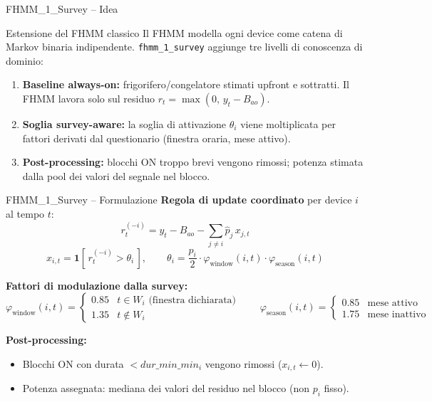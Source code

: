 \documentclass[aspectratio=169]{beamer}
\newcommand{\code}[1]{\texttt{\small #1}}
\begin{document}
\begin{frame}{FHMM\_1\_Survey -- Idea}
  \small
  \begin{block}{Estensione del FHMM classico}
    Il FHMM modella ogni device come catena di Markov binaria indipendente.
    \code{fhmm\_1\_survey} aggiunge tre livelli di conoscenza di dominio:
  \end{block}

  \vspace{0.4em}
  \begin{enumerate}
    \item \textbf{Baseline always-on:} frigorifero/congelatore stimati upfront e sottratti.
          Il FHMM lavora solo sul residuo $r_t = \max(0,\, y_t - B_{ao})$.
    \item \textbf{Soglia survey-aware:} la soglia di attivazione $\theta_i$ viene moltiplicata
          per fattori derivati dal questionario (finestra oraria, mese attivo).
    \item \textbf{Post-processing:} blocchi ON troppo brevi vengono rimossi;
          potenza stimata dalla pool dei valori del segnale nel blocco.
  \end{enumerate}
\end{frame}

\begin{frame}{FHMM\_1\_Survey -- Formulazione}
  \small
  \textbf{Regola di update coordinato} per device $i$ al tempo $t$:
  \[
    r^{(-i)}_t = y_t - B_{ao} - \sum_{j \neq i} \hat{p}_j\, x_{j,t}
  \]
  \[
    x_{i,t} = \mathbf{1}\!\left[\, r^{(-i)}_t > \theta_i \,\right],
    \qquad
    \theta_i = \frac{p_i}{2} \cdot \varphi_{\text{window}}(i,t) \cdot \varphi_{\text{season}}(i,t)
  \]

  \vspace{0.3em}
  \textbf{Fattori di modulazione dalla survey:}
  \[
    \varphi_{\text{window}}(i,t) =
    \begin{cases}
      0.85 & t \in W_i \text{ (finestra dichiarata)} \\
      1.35 & t \notin W_i
    \end{cases}
    \qquad
    \varphi_{\text{season}}(i,t) =
    \begin{cases}
      0.85 & \text{mese attivo} \\
      1.75 & \text{mese inattivo}
    \end{cases}
  \]

  \vspace{0.3em}
  \textbf{Post-processing:}
  \begin{itemize}
    \item Blocchi ON con durata $< dur\_min\_min_i$ vengono rimossi ($x_{i,t} \leftarrow 0$).
    \item Potenza assegnata: mediana dei valori del residuo nel blocco (non $p_i$ fisso).
  \end{itemize}
\end{frame}
\end{document}

